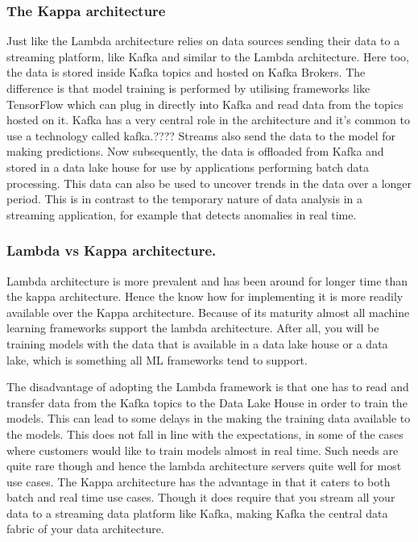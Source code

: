 \subsubsection{The Kappa architecture}
Just like the Lambda architecture relies on data sources sending their data to a streaming platform, like Kafka and similar to the Lambda architecture.
Here too, the data is stored inside Kafka topics and hosted on Kafka Brokers.
The difference is that model training is performed by utilising frameworks like TensorFlow which can plug in directly into Kafka and read data from the topics hosted on it.
Kafka has a very central role in the architecture and it's common to use a technology called kafka.????
Streams also send the data to the model for making predictions.
Now subsequently, the data is offloaded from Kafka and stored in a data lake house for use by applications performing batch data processing.
This data can also be used to uncover trends in the data over a longer period.
This is in contrast to the temporary nature of data analysis in a streaming application, for example that detects anomalies in real time.

\subsubsection{Lambda vs Kappa architecture.}
Lambda architecture is more prevalent and has been around for longer time than the kappa architecture.
Hence the know how for implementing it is more readily available over the Kappa architecture.
Because of its maturity almost all machine learning frameworks support the lambda architecture.
After all, you will be training models with the data that is available in a data lake house or a data lake, which is something all ML frameworks tend to support.

The disadvantage of adopting the Lambda framework is that one has to read and transfer data from the Kafka topics to the Data Lake House in order to train the models.
This can lead to some delays in the making the training data available to the models.
This does not fall in line with the expectations, in some of the cases where customers would like to train models almost in real time.
Such needs are quite rare though and hence the lambda architecture servers quite well for most use cases.
The Kappa architecture has the advantage in that it caters to both batch and real time use cases.
Though it does require that you stream all your data to a streaming data platform like Kafka, making Kafka the central data fabric of your data architecture.

